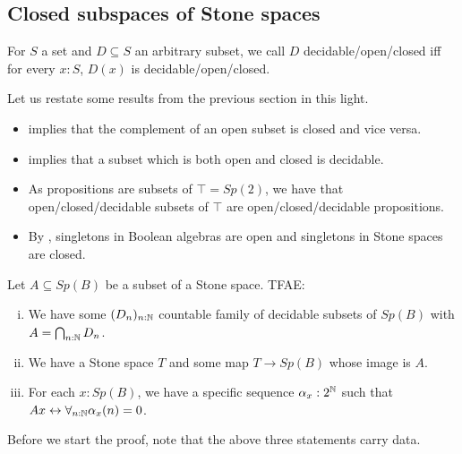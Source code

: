 \subsection{Closed subspaces of Stone spaces}
%
\begin{definition}
  For $S$ a set and $D\subseteq S$ an arbitrary subset, we call $D$ decidable/open/closed 
  iff for every $x:S$, $D(x)$ is decidable/open/closed. 
\end{definition}
\begin{remark}
  Let us restate some results from the previous section in this light. 
  \begin{itemize}
    \item   {} implies that the complement of an 
  open subset is closed and vice versa. 
  \item 
     implies that a subset which is both open 
    and closed is decidable. 
  \item 
    As propositions are subsets of $\top = Sp(2)$, 
    we have that open/closed/decidable subsets of $\top$
    are open/closed/decidable propositions. 
  \item By , singletons in 
    Boolean algebras are open and singletons in Stone spaces are closed. 
\end{itemize}
\end{remark}
\begin{theorem}
  Let $A\subseteq Sp(B)$ be a subset of a Stone space. TFAE:
  \begin{enumerate}[(i)]
    \item We have some $(D_n)_{n:\mathbb{N}}$ countable family 
      of decidable subsets of $Sp(B)$ with $A = \bigcap_{n:\mathbb{N}} D_n$. 
    \item We have a Stone space $T$ and some map $T\to Sp(B)$ 
      whose image is $A$. 
    \item For each $x:Sp(B)$, we have a specific sequence $\alpha_x:2^{\mathbb{N}}$ such that 
      $A x \leftrightarrow \forall_{n:\mathbb{N}} \alpha_x(n) = 0$. 
  \end{enumerate}
\end{theorem}
Before we start the proof, note that the above three statements carry data.
